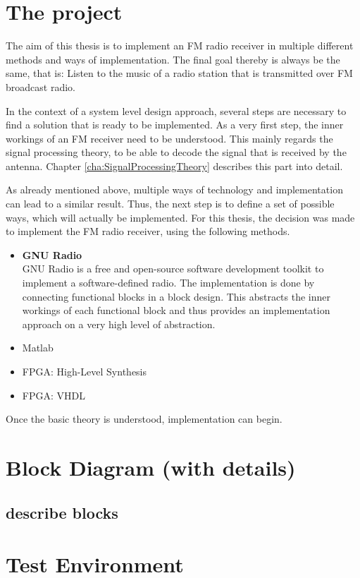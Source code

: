 \section{The project}

The aim of this thesis is to implement an FM radio receiver in multiple different methods and ways of implementation.
The final goal thereby is always be the same, that is: Listen to the music of a radio station that is transmitted over FM broadcast radio.

In the context of a system level design approach, several steps are necessary to find a solution that is ready to be implemented.
As a very first step, the inner workings of an FM receiver need to be understood.
This mainly regards the signal processing theory, to be able to decode the signal that is received by the antenna.
Chapter \ref{cha:SignalProcessingTheory} describes this part into detail.

As already mentioned above, multiple ways of technology and implementation can lead to a similar result.
Thus, the next step is to define a set of possible ways, which will actually be implemented.
For this thesis, the decision was made to implement the FM radio receiver, using the following methods.

\begin{itemize}
  \item \textbf{GNU Radio} \cite{GnuRadio}\\
      GNU Radio is a free and open-source software development toolkit to implement a software-defined radio. The implementation is done by connecting functional blocks in a block design. This abstracts the inner workings of each functional block and thus provides an implementation approach on a very high level of abstraction.
  \item Matlab
  \item FPGA: \cplusplus High-Level Synthesis
  \item FPGA: VHDL
\end{itemize}

Once the basic theory is understood, implementation can begin.




\section{Block Diagram (with details)}
\subsection{describe blocks}

\section{Test Environment}
